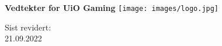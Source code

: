 \begin{titlepage}
\begin{center}
    \vspace*{1cm}

    \Huge
    \textbf{Vedtekter for UiO Gaming}
    \vspace{1cm}
    \vspace{3cm}
    \texttt{[image: images/logo.jpg]}
    \vspace{7cm}

    \LARGE
    Sist revidert:\\
    21.09.2022
\end{center}
\end{titlepage}